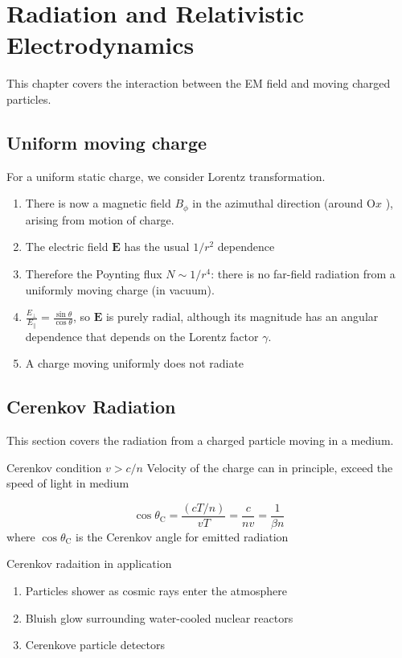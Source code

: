 \documentclass[12pt,a4paper]{article}
\begin{document}
\section{Radiation and Relativistic Electrodynamics}
This chapter covers the interaction between the EM field and moving charged particles.
\subsection{Uniform moving charge}
For a uniform static charge, we consider Lorentz transformation.


\begin{enumerate}
    \item There is now a magnetic field $B_\phi$ in the azimuthal direction (around $\mathrm{O} x$ ), arising from motion of charge.
    \item The electric field $\boldsymbol{E}$ has the usual $1 / r^2$ dependence
    \item Therefore the Poynting flux $N \sim 1 / r^4$: there is no far-field radiation from a uniformly moving charge (in vacuum).
    \item $\frac{E_{\perp}}{E_{\|}}=\frac{\sin \theta}{\cos \theta}$, so $\boldsymbol{E}$ is purely radial, although its magnitude has an angular dependence that depends on the Lorentz factor $\gamma$.
    \item A charge moving uniformly does not radiate
\end{enumerate}
\subsection{Cerenkov Radiation}
This section covers the radiation from a charged particle moving in a medium.
\begin{definition}
    {Cerenkov condition}
    {$v>c/n$}
    {Velocity of the charge can in principle, exceed the speed of light in medium}
\end{definition}
$$
\cos \theta_{\mathrm{C}}=\frac{(c T / n)}{v T}=\frac{c}{n v}=\frac{1}{\beta n}
$$
where $\cos \theta_{\mathrm{C}}$ is the Cerenkov angle for emitted radiation

Cerenkov radaition in application
\begin{enumerate}
    \item Particles shower as cosmic rays enter the atmosphere
    \item Bluish glow surrounding water-cooled nuclear reactors
    \item Cerenkove particle detectors 
\end{enumerate}
\end{document}
